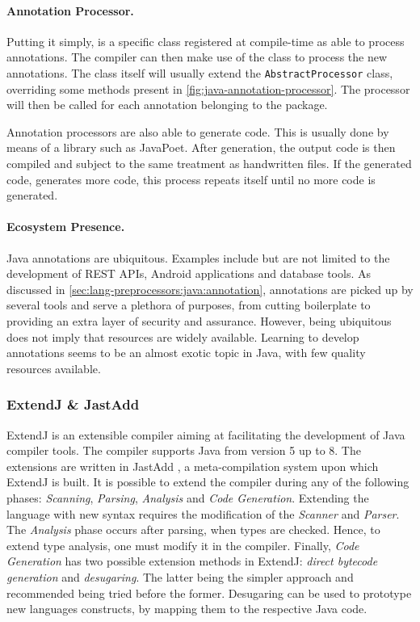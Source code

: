\paragraph{Annotation Processor.}
Putting it simply, is a specific class registered at compile-time as able to process annotations.
The compiler can then make use of the class to process the new annotations.
The class itself will usually extend the \texttt{AbstractProcessor} class,
overriding some methods present in \autoref{fig:java-annotation-processor}.
The processor will then be called for each annotation belonging to the package.

Annotation processors are also able to generate code.
This is usually done by means of a library such as JavaPoet.
After generation, the output code is then compiled and subject to the same treatment as handwritten files.
If the generated code, generates more code, this process repeats itself until no more code is generated.

\paragraph{Ecosystem Presence.}
Java annotations are ubiquitous.
Examples include but are not limited to the development of REST \gls{API}s,
Android applications and database tools.
As discussed in \autoref{sec:lang-preprocessors:java:annotation},
annotations are picked up by several tools and serve a plethora of purposes,
from cutting boilerplate to providing an extra layer of security and assurance.
However, being ubiquitous does not imply that resources are widely available.
Learning to develop annotations seems to be an almost exotic topic in Java,
with few quality resources available.

\subsubsection*{ExtendJ \& JastAdd}\label{sec:lang-preprocessors:java:extendj}

ExtendJ is an extensible compiler aiming at facilitating the development of Java compiler tools.
The compiler supports Java from version 5 up to 8.
The extensions are written in JastAdd , a meta-compilation system upon which ExtendJ is built.
It is possible to extend the compiler during any of the following phases: \emph{Scanning}, \emph{Parsing}, \emph{Analysis} and \emph{Code Generation}.
Extending the language with new syntax requires the modification of the \emph{Scanner} and \emph{Parser}.
The \emph{Analysis} phase occurs after parsing, when types are checked.
Hence, to extend type analysis, one must modify it in the compiler.
Finally, \emph{Code Generation} has two possible extension methods in ExtendJ:
\emph{direct bytecode generation} and \emph{desugaring}.
The latter being the simpler approach and recommended being tried before the former.
Desugaring can be used to prototype new languages constructs, by mapping them to the respective Java code.

